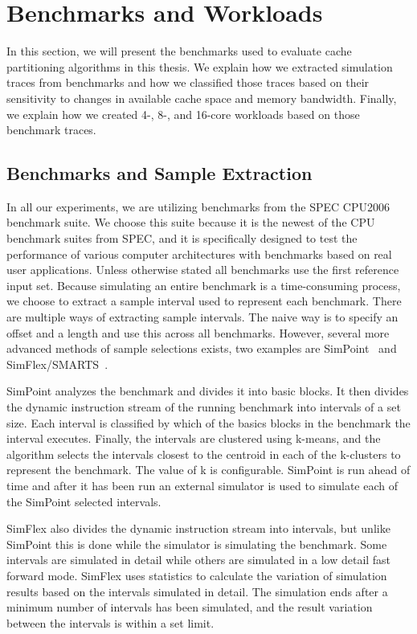 
\section{Benchmarks and Workloads}
\label{sec:methodology:benchmarks}

In this section, we will present the benchmarks used to evaluate cache partitioning algorithms in this thesis.
We explain how we extracted simulation traces from benchmarks and how we classified those traces based on their sensitivity to changes in available cache space and memory bandwidth. 
Finally, we explain how we created 4-, 8-, and 16-core workloads based on those benchmark traces.

\subsection{Benchmarks and Sample Extraction}
\label{sec:methodology:benchmarks:benchmarks}

In all our experiments, we are utilizing benchmarks from the SPEC CPU2006~\cite{SPECCPU2006} benchmark suite. 
We choose this suite because it is the newest of the CPU benchmark suites from SPEC, and it is specifically designed to test the performance of various computer architectures with benchmarks based on real user applications.
Unless otherwise stated all benchmarks use the first reference input set.
Because simulating an entire benchmark is a time-consuming process, we choose to extract a sample interval used to represent each benchmark.
There are multiple ways of extracting sample intervals.
The naive way is to specify an offset and a length and use this across all benchmarks.
However, several more advanced methods of sample selections exists, two examples are SimPoint~\cite{Hamerly2005} and SimFlex/SMARTS~\cite{Hardavellas2004, Wunderlich2003}.

SimPoint analyzes the benchmark and divides it into basic blocks.
It then divides the dynamic instruction stream of the running benchmark into intervals of a set size.
Each interval is classified by which of the basics blocks in the benchmark the interval executes.
Finally, the intervals are clustered using k-means, and the algorithm selects the intervals closest to the centroid in each of the k-clusters to represent the benchmark.
The value of k is configurable.
SimPoint is run ahead of time and after it has been run an external simulator is used to simulate each of the SimPoint selected intervals.

SimFlex also divides the dynamic instruction stream into intervals, but unlike SimPoint this is done while the simulator is simulating the benchmark.
Some intervals are simulated in detail while others are simulated in a low detail fast forward mode.
SimFlex uses statistics to calculate the variation of simulation results based on the intervals simulated in detail.
The simulation ends after a minimum number of intervals has been simulated, and the result variation between the intervals is within a set limit.

